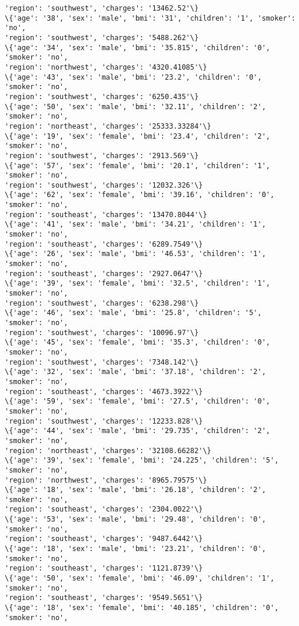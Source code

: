 \documentclass[11pt]{article}
\begin{document}
\begin{Verbatim}[commandchars=\\\{\}]
'region': 'southwest', 'charges': '13462.52'\}
\{'age': '38', 'sex': 'male', 'bmi': '31', 'children': '1', 'smoker': 'no',
'region': 'southwest', 'charges': '5488.262'\}
\{'age': '34', 'sex': 'male', 'bmi': '35.815', 'children': '0', 'smoker': 'no',
'region': 'northwest', 'charges': '4320.41085'\}
\{'age': '43', 'sex': 'male', 'bmi': '23.2', 'children': '0', 'smoker': 'no',
'region': 'southwest', 'charges': '6250.435'\}
\{'age': '50', 'sex': 'male', 'bmi': '32.11', 'children': '2', 'smoker': 'no',
'region': 'northeast', 'charges': '25333.33284'\}
\{'age': '19', 'sex': 'female', 'bmi': '23.4', 'children': '2', 'smoker': 'no',
'region': 'southwest', 'charges': '2913.569'\}
\{'age': '57', 'sex': 'female', 'bmi': '20.1', 'children': '1', 'smoker': 'no',
'region': 'southwest', 'charges': '12032.326'\}
\{'age': '62', 'sex': 'female', 'bmi': '39.16', 'children': '0', 'smoker': 'no',
'region': 'southeast', 'charges': '13470.8044'\}
\{'age': '41', 'sex': 'male', 'bmi': '34.21', 'children': '1', 'smoker': 'no',
'region': 'southeast', 'charges': '6289.7549'\}
\{'age': '26', 'sex': 'male', 'bmi': '46.53', 'children': '1', 'smoker': 'no',
'region': 'southeast', 'charges': '2927.0647'\}
\{'age': '39', 'sex': 'female', 'bmi': '32.5', 'children': '1', 'smoker': 'no',
'region': 'southwest', 'charges': '6238.298'\}
\{'age': '46', 'sex': 'male', 'bmi': '25.8', 'children': '5', 'smoker': 'no',
'region': 'southwest', 'charges': '10096.97'\}
\{'age': '45', 'sex': 'female', 'bmi': '35.3', 'children': '0', 'smoker': 'no',
'region': 'southwest', 'charges': '7348.142'\}
\{'age': '32', 'sex': 'male', 'bmi': '37.18', 'children': '2', 'smoker': 'no',
'region': 'southeast', 'charges': '4673.3922'\}
\{'age': '59', 'sex': 'female', 'bmi': '27.5', 'children': '0', 'smoker': 'no',
'region': 'southwest', 'charges': '12233.828'\}
\{'age': '44', 'sex': 'male', 'bmi': '29.735', 'children': '2', 'smoker': 'no',
'region': 'northeast', 'charges': '32108.66282'\}
\{'age': '39', 'sex': 'female', 'bmi': '24.225', 'children': '5', 'smoker': 'no',
'region': 'northwest', 'charges': '8965.79575'\}
\{'age': '18', 'sex': 'male', 'bmi': '26.18', 'children': '2', 'smoker': 'no',
'region': 'southeast', 'charges': '2304.0022'\}
\{'age': '53', 'sex': 'male', 'bmi': '29.48', 'children': '0', 'smoker': 'no',
'region': 'southeast', 'charges': '9487.6442'\}
\{'age': '18', 'sex': 'male', 'bmi': '23.21', 'children': '0', 'smoker': 'no',
'region': 'southeast', 'charges': '1121.8739'\}
\{'age': '50', 'sex': 'female', 'bmi': '46.09', 'children': '1', 'smoker': 'no',
'region': 'southeast', 'charges': '9549.5651'\}
\{'age': '18', 'sex': 'female', 'bmi': '40.185', 'children': '0', 'smoker': 'no',

\end{Verbatim}
\end{document}
